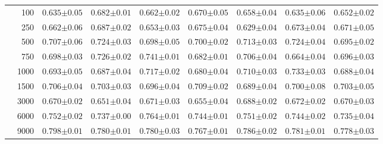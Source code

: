 \begin{landscape}
\begin{table}[p]
\begin{tabular}{cr| *{7}{C{2cm}}}
        & 100 & $0.635{\scriptscriptstyle\pm0.05}$ & $0.682{\scriptscriptstyle\pm0.01}$ & $0.662{\scriptscriptstyle\pm0.02}$ & $0.670{\scriptscriptstyle\pm0.05}$ & $0.658{\scriptscriptstyle\pm0.04}$ & $0.635{\scriptscriptstyle\pm0.06}$ & $0.652{\scriptscriptstyle\pm0.02}$ \\
        & 250 & $0.662{\scriptscriptstyle\pm0.06}$ & $0.687{\scriptscriptstyle\pm0.02}$ & $0.653{\scriptscriptstyle\pm0.03}$ & $0.675{\scriptscriptstyle\pm0.04}$ & $0.629{\scriptscriptstyle\pm0.04}$ & $0.673{\scriptscriptstyle\pm0.04}$ & $0.671{\scriptscriptstyle\pm0.05}$ \\
        & 500 & $0.707{\scriptscriptstyle\pm0.06}$ & $0.724{\scriptscriptstyle\pm0.03}$ & $0.698{\scriptscriptstyle\pm0.05}$ & $0.700{\scriptscriptstyle\pm0.02}$ & $0.713{\scriptscriptstyle\pm0.03}$ & $0.724{\scriptscriptstyle\pm0.04}$ & $0.695{\scriptscriptstyle\pm0.02}$ \\
        & 750 & $0.698{\scriptscriptstyle\pm0.03}$ & $0.726{\scriptscriptstyle\pm0.02}$ & $0.741{\scriptscriptstyle\pm0.01}$ & $0.682{\scriptscriptstyle\pm0.01}$ & $0.706{\scriptscriptstyle\pm0.04}$ & $0.664{\scriptscriptstyle\pm0.04}$ & $0.696{\scriptscriptstyle\pm0.03}$ \\
        & 1000 & $0.693{\scriptscriptstyle\pm0.05}$ & $0.687{\scriptscriptstyle\pm0.04}$ & $0.717{\scriptscriptstyle\pm0.02}$ & $0.680{\scriptscriptstyle\pm0.04}$ & $0.710{\scriptscriptstyle\pm0.03}$ & $0.733{\scriptscriptstyle\pm0.03}$ & $0.688{\scriptscriptstyle\pm0.04}$ \\
        & 1500 & $0.706{\scriptscriptstyle\pm0.04}$ & $0.703{\scriptscriptstyle\pm0.03}$ & $0.696{\scriptscriptstyle\pm0.04}$ & $0.709{\scriptscriptstyle\pm0.02}$ & $0.689{\scriptscriptstyle\pm0.04}$ & $0.700{\scriptscriptstyle\pm0.08}$ & $0.703{\scriptscriptstyle\pm0.05}$ \\
        & 3000 & $0.670{\scriptscriptstyle\pm0.02}$ & $0.651{\scriptscriptstyle\pm0.04}$ & $0.671{\scriptscriptstyle\pm0.03}$ & $0.655{\scriptscriptstyle\pm0.04}$ & $0.688{\scriptscriptstyle\pm0.02}$ & $0.672{\scriptscriptstyle\pm0.02}$ & $0.670{\scriptscriptstyle\pm0.03}$ \\
        & 6000 & $0.752{\scriptscriptstyle\pm0.02}$ & $0.737{\scriptscriptstyle\pm0.00}$ & $0.764{\scriptscriptstyle\pm0.01}$ & $0.744{\scriptscriptstyle\pm0.01}$ & $0.751{\scriptscriptstyle\pm0.02}$ & $0.744{\scriptscriptstyle\pm0.02}$ & $0.735{\scriptscriptstyle\pm0.04}$ \\
        & 9000 & $0.798{\scriptscriptstyle\pm0.01}$ & $0.780{\scriptscriptstyle\pm0.01}$ & $0.780{\scriptscriptstyle\pm0.03}$ & $0.767{\scriptscriptstyle\pm0.01}$ & $0.786{\scriptscriptstyle\pm0.02}$ & $0.781{\scriptscriptstyle\pm0.01}$ & $0.778{\scriptscriptstyle\pm0.03}$ \\

\end{tabular}
\end{table}
\end{landscape}
